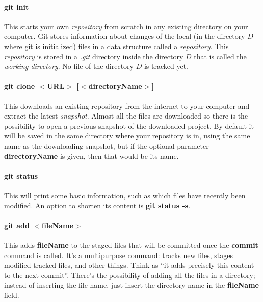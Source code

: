 \documentclass[a4paper, 12pt]{article}
\begin{document}
\paragraph{git init}
This starts your own \emph{repository} from scratch in any existing directory on your computer. Git stores information about changes of the local (in the directory $D$ where git is initialized) files in a data structure called a \emph{repository}. This \emph{repository} is stored in a \emph{.git} directory inside the directory $D$ that is called the \emph{working directory}. No file of the directory $D$ is tracked yet.

\paragraph{git clone $<$URL$>$ [$<$directoryName$>$]}
This downloads an existing repository from the internet to your computer and extract the latest \emph{snapshot}. Almost all the files are downloaded so there is the possibility to open a previous snapshot of the downloaded project. By default it will be saved in the same directory where your repository is in, using the same name as the downloading snapshot, but if the optional parameter \textbf{directoryName} is given, then that would be its name.

\paragraph{git status}
This will print some basic information, such as which files have recently been modified. An option to shorten its content is \textbf{git status -s}.

\paragraph{git add $<$fileName$>$}
This adds \textbf{fileName} to the staged files that will be committed once the \textbf{commit} command is called. It's a multipurpose command: tracks new files, stages modified tracked files, and other things. Think as ``it adds precisely this content to the next commit''. There's the possibility of adding all the files in a directory; instead of inserting the file name, just insert the directory name in the \textbf{fileName} field. 
\end{document}

